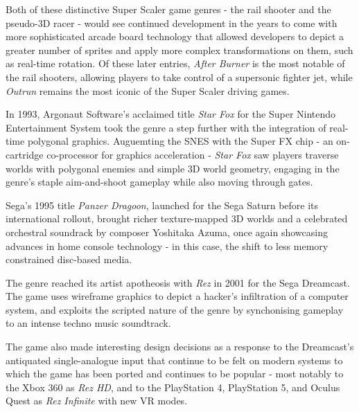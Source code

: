 \documentclass[11pt]{article}
\begin{document}
Both of these distinctive Super Scaler game genres - the rail shooter and the pseudo-3D
racer - would see continued development in the years to come with more sophisticated arcade board
technology that allowed developers to depict a greater number of sprites and apply more complex
transformations on them, such as real-time rotation. Of these later entries, \textit{After Burner} is the
most notable of the rail shooters, allowing players to take control of a supersonic fighter jet, while
\textit{Outrun} remains the most iconic of the Super Scaler driving games.

In 1993, Argonaut Software's acclaimed title \textit{Star Fox}\cite{star_fox} for the Super Nintendo Entertainment
System took the genre a step further with the integration of real-time polygonal graphics. Auguemting
the SNES with the Super FX chip - an on-cartridge co-processor for graphics acceleration -
\textit{Star Fox} saw players traverse worlds with polygonal enemies and simple 3D world geometry,
engaging in the genre's staple aim-and-shoot gameplay while also moving through gates.

Sega's 1995 title \textit{Panzer Dragoon}\cite{panzer_dragoon}, launched for the Sega Saturn before its international
rollout, brought richer texture-mapped 3D worlds and a celebrated orchestral soundrack by composer
Yoshitaka Azuma, once again showcasing advances in home console technology - in this case, the
shift to less memory constrained disc-based media.

The genre reached its artist apotheosis with \textit{Rez}\cite{rez} in 2001 for the Sega Dreamcast.
The game uses wireframe graphics to depict a hacker's infiltration of a computer system, and exploits the
scripted nature of the genre by synchonising gameplay to an intense techno music soundtrack.

The game also made interesting design decisions as a response to the Dreamcast's antiquated
single-analogue input that continue to be felt on modern systems to which the game has been ported and
continues to be popular - most notably to the Xbox 360 as \textit{Rez HD}, and to the PlayStation 4,
PlayStation 5, and Oculus Quest as \textit{Rez Infinite} with new VR modes.
\end{document}
